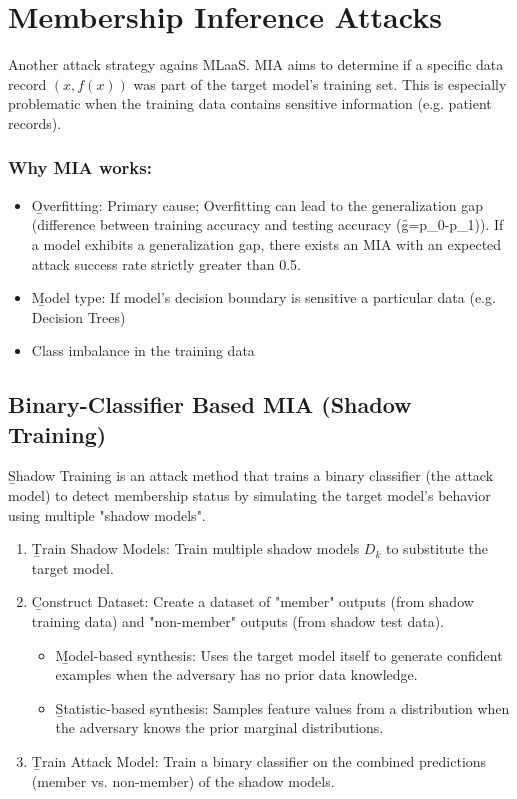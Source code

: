 \section{Membership Inference Attacks}
Another attack strategy agains MLaaS. MIA aims to determine if a specific data record $(x, f(x))$ was part of the target model's training set. This is especially problematic when the training data contains sensitive information (e.g. patient records).

\subsubsection*{Why MIA works:}
\begin{itemize}
    \item \b{Overfitting}: Primary cause; Overfitting can lead to the \b{generalization gap} (difference between training accuracy and testing accuracy (\f{g=p_{0}-p_{1}})). If a model exhibits a generalization gap, there exists an MIA with an expected attack success rate strictly greater than 0.5.
    \item \b{Model type}: If model's decision boundary is sensitive a particular data (e.g. Decision Trees)
    \item Class imbalance in the training data
\end{itemize}



\subsection{Binary-Classifier Based MIA (Shadow Training)}
\b{Shadow Training} is an attack method that trains a binary classifier (the attack model) to detect membership status by simulating the target model's behavior using multiple "shadow models".
\begin{enumerate}
    \item \b{Train Shadow Models}: Train multiple shadow models $D_k$ to substitute the target model.
    \item \b{Construct Dataset}: Create a dataset of "member" outputs (from shadow training data) and "non-member" outputs (from shadow test data).
    \begin{itemize}
        \item \b{Model-based synthesis}: Uses the target model itself to generate confident examples when the adversary has no prior data knowledge.
        \item \b{Statistic-based synthesis}: Samples feature values from a distribution when the adversary knows the prior marginal distributions.
    \end{itemize}
    \item \b{Train Attack Model}: Train a binary classifier on the combined predictions (member vs. non-member) of the shadow models.
\end{enumerate}


